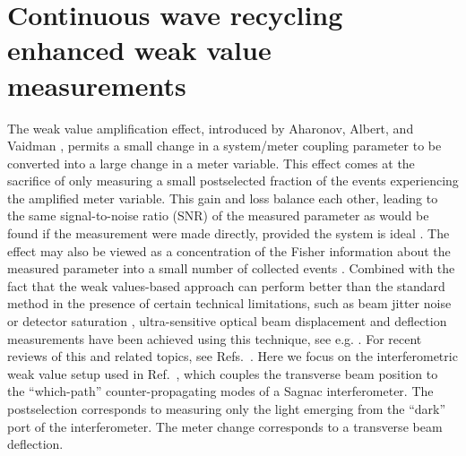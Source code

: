 \chapter[Continuous wave recycling]{Continuous wave recycling enhanced weak value measurements}\label{ch:cw}
The weak value amplification effect, introduced by Aharonov, Albert, and Vaidman \cite{Aharonov1988}, permits a small change in a system/meter coupling parameter to be converted into a large change in a meter variable.  This effect comes at the sacrifice of only measuring a small postselected fraction of the events experiencing the amplified meter variable.  This gain and loss balance each other, leading to the same signal-to-noise ratio (SNR) of the measured parameter as would be found if the measurement were made directly, provided the system is ideal \cite{Starling2010}.  The effect may also be viewed as a concentration of the Fisher information about the measured parameter into a small number of collected events \cite{Jordan2014,Viza2014,Pang2014}.  Combined with the fact that the weak values-based approach can perform better than the standard method in the presence of certain technical limitations, such as beam jitter noise or detector saturation \cite{Jordan2014,Viza2014}, ultra-sensitive optical beam displacement and deflection measurements have been achieved using this technique, see e.g. \cite{Hosten2008,Dixon2009,Hogan2011}.  For recent reviews of this and related topics, see Refs.~\cite{Kofman2011,Dressel2014}.  Here we focus on the interferometric weak value setup used in Ref.~\cite{Dixon2009}, which couples the transverse beam position to the ``which-path'' counter-propagating modes of a Sagnac interferometer.  The postselection corresponds to measuring only the light emerging from the ``dark'' port of the interferometer.  The meter change corresponds to a transverse beam deflection.

